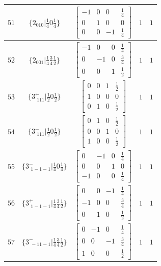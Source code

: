 \documentclass[fleqn,8pt]{jsarticle}
\begin{document}
\begin{longtable}{ccccc}
$ 51 $ & $ \{2{}_{010}|\frac{1}{4} 0 \frac{1}{4}\} $ & $ \begin{bmatrix} -1 & 0 & 0 & \frac{1}{4} \\ 0 & 1 & 0 & 0 \\ 0 & 0 & -1 & \frac{1}{4} \end{bmatrix} $ & $ 1 $ & $ 1 $ \\ \hline
$ 52 $ & $ \{2{}_{001}|\frac{1}{4} \frac{3}{4} \frac{1}{2}\} $ & $ \begin{bmatrix} -1 & 0 & 0 & \frac{1}{4} \\ 0 & -1 & 0 & \frac{3}{4} \\ 0 & 0 & 1 & \frac{1}{2} \end{bmatrix} $ & $ 1 $ & $ 1 $ \\ \hline
$ 53 $ & $ \{3^{+}_{\,\,111}|\frac{1}{2} 0 \frac{1}{2}\} $ & $ \begin{bmatrix} 0 & 0 & 1 & \frac{1}{2} \\ 1 & 0 & 0 & 0 \\ 0 & 1 & 0 & \frac{1}{2} \end{bmatrix} $ & $ 1 $ & $ 1 $ \\ \hline
$ 54 $ & $ \{3^{-}_{\,\,111}|\frac{1}{2} 0 \frac{1}{2}\} $ & $ \begin{bmatrix} 0 & 1 & 0 & \frac{1}{2} \\ 0 & 0 & 1 & 0 \\ 1 & 0 & 0 & \frac{1}{2} \end{bmatrix} $ & $ 1 $ & $ 1 $ \\ \hline
$ 55 $ & $ \{3^{-}_{\,\,1-1-1}|\frac{1}{4} 0 \frac{1}{4}\} $ & $ \begin{bmatrix} 0 & -1 & 0 & \frac{1}{4} \\ 0 & 0 & 1 & 0 \\ -1 & 0 & 0 & \frac{1}{4} \end{bmatrix} $ & $ 1 $ & $ 1 $ \\ \hline
$ 56 $ & $ \{3^{+}_{\,\,1-1-1}|\frac{1}{4} \frac{3}{4} \frac{1}{2}\} $ & $ \begin{bmatrix} 0 & 0 & -1 & \frac{1}{4} \\ -1 & 0 & 0 & \frac{3}{4} \\ 0 & 1 & 0 & \frac{1}{2} \end{bmatrix} $ & $ 1 $ & $ 1 $ \\ \hline
$ 57 $ & $ \{3^{-}_{\,\,-11-1}|\frac{1}{4} \frac{3}{4} \frac{1}{2}\} $ & $ \begin{bmatrix} 0 & -1 & 0 & \frac{1}{4} \\ 0 & 0 & -1 & \frac{3}{4} \\ 1 & 0 & 0 & \frac{1}{2} \end{bmatrix} $ & $ 1 $ & $ 1 $ \\ \hline

\end{longtable}
\end{document}
